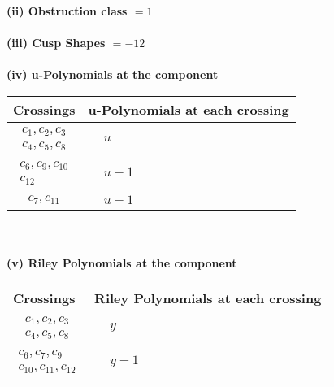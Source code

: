 \documentclass[1p]{elsarticle_modified}
\theoremstyle{definition}
\begin{document}
\flushleft \textbf{(ii) Obstruction class $= 1$}\\~\\
\flushleft \textbf{(iii) Cusp Shapes $= -12$}\\~\\
\newpage\renewcommand{\arraystretch}{1}
\flushleft \textbf{(iv) u-Polynomials at the component}\newline \\
\begin{tabular}{m{50pt}|m{274pt}}
Crossings & \hspace{64pt}u-Polynomials at each crossing \\
\hline $$\begin{aligned}c_{1},c_{2},c_{3}\\c_{4},c_{5},c_{8}\end{aligned}$$&$\begin{aligned}
&u
\end{aligned}$\\
\hline $$\begin{aligned}c_{6},c_{9},c_{10}\\c_{12}\end{aligned}$$&$\begin{aligned}
&u+1
\end{aligned}$\\
\hline $$\begin{aligned}c_{7},c_{11}\end{aligned}$$&$\begin{aligned}
&u-1
\end{aligned}$\\
\hline
\end{tabular}\\~\\
\newpage\renewcommand{\arraystretch}{1}
\flushleft \textbf{(v) Riley Polynomials at the component}\newline \\
\begin{tabular}{m{50pt}|m{274pt}}
Crossings & \hspace{64pt}Riley Polynomials at each crossing \\
\hline $$\begin{aligned}c_{1},c_{2},c_{3}\\c_{4},c_{5},c_{8}\end{aligned}$$&$\begin{aligned}
&y
\end{aligned}$\\
\hline $$\begin{aligned}c_{6},c_{7},c_{9}\\c_{10},c_{11},c_{12}\end{aligned}$$&$\begin{aligned}
&y-1
\end{aligned}$\\
\hline
\end{tabular}\\~\\
\end{document}
